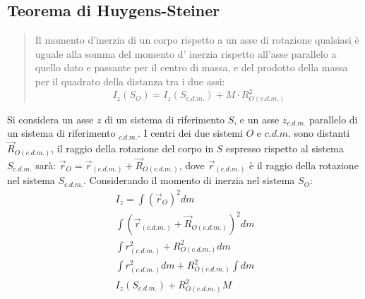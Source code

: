 \documentclass{article}
\numberwithin{equation}{subsection}
\begin{document}
\subsection{Teorema di Huygens-Steiner}
\begin{quotation}
    Il momento d'inerzia di un corpo rispetto a un asse di 
    rotazione qualsiasi è uguale alla somma del momento d'
    inerzia rispetto all'asse parallelo a quello dato e 
    passante per il centro di massa, e del prodotto della massa 
    per il quadrato della distanza tra i due assi:
    \begin{equation}
        I_z(S_O)=I_z(S_{c.d.m.})+M\cdot R^2_{O(c.d.m.)}
    \end{equation}
\end{quotation}
Si considera un asse $z$ di un sistema di riferimento $S$, e 
un asse $z_{c.d.m.}$ parallelo di un sistema di riferimento $_{c.d.m.}$. 
I centri dei due sistemi $O$ e $c.d.m.$ sono distanti $\vec{R}_{O(c.d.m.)}$, 
il raggio della rotazione del corpo in $S$ espresso rispetto al 
sistema $S_{c.d.m.}$ sarà: $\vec{r}_O=\vec{r}_{(c.d.m.)}+\vec{R}_{O(c.d.m.)}$,  
dove $\vec{r}_{(c.d.m.)}$ è il raggio della rotazione nel sistema $S_{c.d.m.}$. 
Considerando il momento di inerzia nel sistema $S_O$:
\begin{gather}
    I_z=\displaystyle\int (\vec{r}_O)^2dm\\
    \int(\vec{r}_{(c.d.m.)}+\vec{R}_{O(c.d.m.)})^2dm\\
    \int r_{(c.d.m.)}^2+R_{O(c.d.m.)}^2dm\\
    \int r_{(c.d.m.)}^2dm+R_{O(c.d.m.)}^2\int dm\\
    I_z(S_{c.d.m.})+R_{O(c.d.m.)}^2M
\end{gather}
\end{document}
